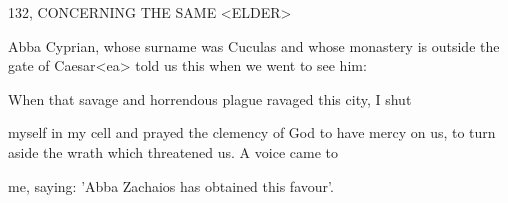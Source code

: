 132, CONCERNING THE SAME <ELDER>

Abba Cyprian, whose surname was Cuculas and whose monastery
is outside the gate of Caesar<ea> told us this when we went to see
him:

When that savage and horrendous plague ravaged this city, I shut

myself in my cell and prayed the clemency of God to have mercy on
us, to turn aside the wrath which threatened us.
A voice came to

me, saying: 'Abba Zachaios has obtained this favour'.

